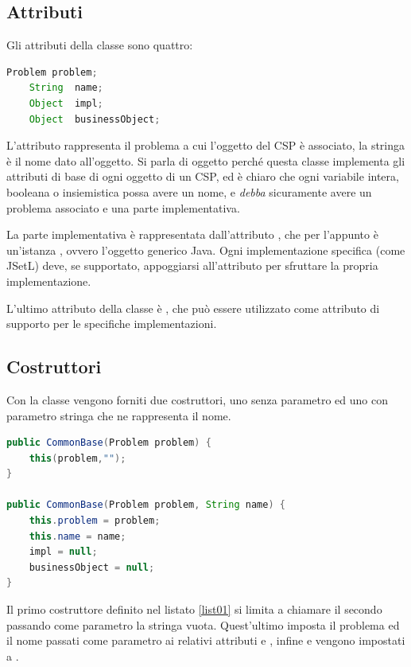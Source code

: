 \subsection{Attributi}
Gli attributi della classe  sono quattro:
\begin{lstlisting}[language = Java, frame = single]
	Problem problem;
	String  name;
	Object  impl;
	Object  businessObject;
\end{lstlisting}
L'attributo
 rappresenta il problema a cui l'oggetto del CSP è associato,
la stringa  è il nome dato all'oggetto. Si parla di oggetto
perché questa classe implementa gli attributi di base di ogni oggetto di un
CSP, ed è chiaro che ogni variabile intera, booleana o insiemistica possa avere
un nome, e \emph{debba} sicuramente avere un problema associato e una
parte implementativa.

La parte implementativa è rappresentata dall'attributo , che per
l'appunto è un'istanza , ovvero l'oggetto generico Java. Ogni
implementazione specifica (come JSetL) deve, se supportato, appoggiarsi
all'attributo  per sfruttare la propria implementazione.

L'ultimo attributo della classe è , che può essere
utilizzato come attributo di supporto per le specifiche implementazioni.

\subsection{Costruttori}
Con la classe  vengono forniti due costruttori, uno senza 
parametro ed uno con parametro stringa che ne rappresenta il nome.
\begin{lstlisting}[language = Java,
                   caption = {costruttori di \files{CommonBase}.},
                   label = list01]
public CommonBase(Problem problem) {
	this(problem,"");
}

public CommonBase(Problem problem, String name) {
	this.problem = problem;
	this.name = name;
	impl = null;
	businessObject = null;
}
\end{lstlisting}
Il primo costruttore definito nel listato \ref{list01} si limita a chiamare il 
secondo passando come parametro la stringa vuota. Quest'ultimo imposta il
problema ed il nome passati come parametro ai relativi attributi 
e , infine  e  vengono impostati
a .

